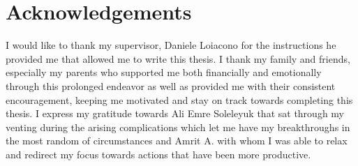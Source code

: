 \documentclass{Configuration_Files/PoliMi3i_thesis}
\begin{document}
\listoffigures

\listoftables


\chapter*{Acknowledgements}
I would like to thank my supervisor, Daniele Loiacono for the instructions he provided me that allowed me to write this thesis.
I thank my family and friends, especially my parents who supported me both financially and emotionally through this prolonged endeavor as well as provided me with their consistent encouragement, keeping me motivated and stay on track towards completing this thesis. I express my gratitude towards Ali Emre Soleleyuk that sat through my venting during the arising complications which let me have my breakthroughs in the most random of circumstances and Amrit A. with whom I was able to relax and redirect my focus towards actions that have been more productive.

\cleardoublepage
\end{document}
